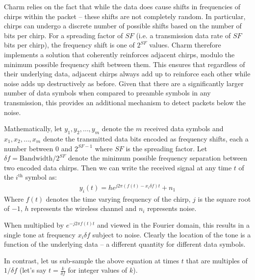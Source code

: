Charm relies on the fact that while the data does cause shifts in frequencies
of chirps within the packet -- these shifts are not completely random. In
particular, chirps can undergo a discrete number of possible shifts based on
the number of bits per chirp. For a spreading factor of $SF$ (i.e. a
transmission data rate of $SF$ bits per chirp), the frequency shift is one of
$2^{SF}$ values. Charm therefore implements a solution that coherently
reinforces adjacent chirps, modulo the minimum possible frequency shift
between them. This ensures that regardless of their underlying data, adjacent
chirps always add up to reinforce each other while noise adds up destructively
as before. Given that there are a significantly larger number of data symbols
when compared to preamble symbols in any transmission, this provides an
additional mechanism to detect packets below the noise.

Mathematically, let $y_1, y_2, \dots, y_m$ denote the $m$ received data
symbols and $x_1, x_2, \dots, x_m$ denote the transmitted data bits encoded as
frequency shifts, each a number between $0$ and $2^{SF-1}$ where $SF$ is the
spreading factor. Let $\delta f = \text{Bandwidth} / 2^{SF}$ denote the
minimum possible frequency separation between two encoded data chirps.  Then
we can write the received signal at any time $t$ of the $i^{\text{th}}$ symbol
as:
\begin{align}
    y_i(t) = h e^{j 2 \pi (f(t) - x_i \delta f) t} + n_1 \label{eqn:yi}
\end{align}
Where $f(t)$ denotes the time varying frequency of the chirp, $j$ is the
square root of $-1$, $h$ represents the wireless channel and $n_i$ represents
noise.

When multiplied by $e^{-j 2 \pi f(t) t}$ and viewed in the Fourier domain,
this results in a single tone at frequency $x_i \delta f$ subject to noise.
Clearly the location of the tone is a function of the underlying data -- a
different quantity for different data symbols.

In contrast, let us sub-sample the above equation at times $t$ that are
multiples of $1/\delta f$ (let's say $t = \frac{k}{\delta f}$ for integer
values of $k$).

